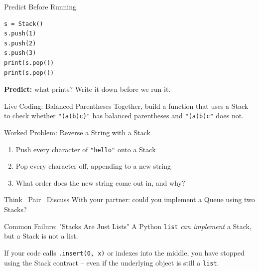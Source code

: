 \documentclass[aspectratio=169]{beamer}
\begin{document}
\begin{frame}[fragile]{Predict Before Running}
\predictkicker
\begin{lstlisting}
s = Stack()
s.push(1)
s.push(2)
s.push(3)
print(s.pop())
print(s.pop())
\end{lstlisting}
  \vspace{2mm}
  \textbf{Predict:} what prints? Write it down before we run it.
\end{frame}

\begin{livecodingframe}{Live Coding: Balanced Parentheses}
  Together, build a function that uses a Stack to check whether
  \texttt{"(a(b)c)"} has balanced parentheses and \texttt{"(a(b)c"} does not.

\end{livecodingframe}

\begin{workedproblemframe}{Worked Problem: Reverse a String with a Stack}
  \begin{enumerate}
    \item Push every character of \texttt{"hello"} onto a Stack
    \item Pop every character off, appending to a new string
    \item What order does the new string come out in, and why?
  \end{enumerate}
\end{workedproblemframe}

\begin{pairdiscussframe}{Think \textbullet\ Pair \textbullet\ Discuss}
  With your partner: could you implement a Queue using two Stacks?
\end{pairdiscussframe}

\begin{misconceptionframe}{Common Failure: "Stacks Are Just Lists"}
  A Python \texttt{list} \emph{can implement} a Stack, but a Stack is not
  a list.

  \vspace{2mm}
  If your code calls \texttt{.insert(0, x)} or indexes into the middle,
  you have stopped using the Stack contract -- even if the underlying
  object is still a \texttt{list}.
\end{misconceptionframe}
\end{document}
